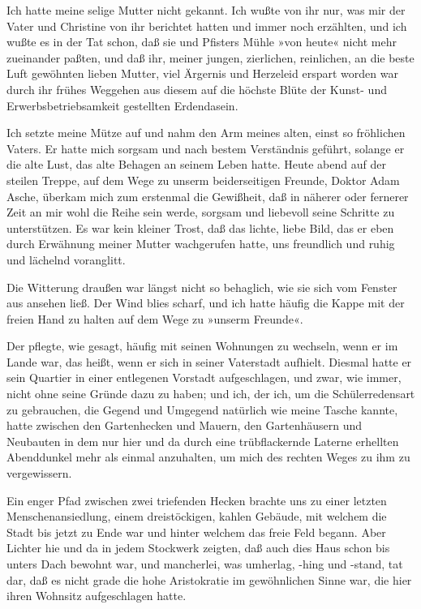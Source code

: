 Ich hatte meine selige Mutter nicht gekannt. Ich wußte von ihr nur,
was mir der Vater und Christine von ihr berichtet hatten und immer
noch erzählten, und ich wußte es in der Tat schon, daß sie und
Pfisters Mühle »von heute« nicht mehr zueinander paßten, und daß
ihr, meiner jungen, zierlichen, reinlichen, an die beste Luft
gewöhnten lieben Mutter, viel Ärgernis und Herzeleid erspart worden
war durch ihr frühes Weggehen aus diesem auf die höchste Blüte der
Kunst- und Erwerbsbetriebsamkeit gestellten Erdendasein.

Ich setzte meine Mütze auf und nahm den Arm meines alten, einst so
fröhlichen Vaters. Er hatte mich sorgsam und nach bestem
Verständnis geführt, solange er die alte Lust, das alte Behagen an
seinem Leben hatte. Heute abend auf der steilen Treppe, auf dem
Wege zu unserm beiderseitigen Freunde, Doktor Adam Asche, überkam
mich zum erstenmal die Gewißheit, daß in näherer oder fernerer Zeit
an mir wohl die Reihe sein werde, sorgsam und liebevoll seine
Schritte zu unterstützen. Es war kein kleiner Trost, daß das
lichte, liebe Bild, das er eben durch Erwähnung meiner Mutter
wachgerufen hatte, uns freundlich und ruhig und lächelnd
voranglitt.

Die Witterung draußen war längst nicht so behaglich, wie sie sich
vom Fenster aus ansehen ließ. Der Wind blies scharf, und ich hatte
häufig die Kappe mit der freien Hand zu halten auf dem Wege zu
»unserm Freunde«.

Der pflegte, wie gesagt, häufig mit seinen Wohnungen zu wechseln,
wenn er im Lande war, das heißt, wenn er sich in seiner Vaterstadt
aufhielt. Diesmal hatte er sein Quartier in einer entlegenen
Vorstadt aufgeschlagen, und zwar, wie immer, nicht ohne seine
Gründe dazu zu haben; und ich, der ich, um die Schülerredensart zu
gebrauchen, die Gegend und Umgegend natürlich wie meine Tasche
kannte, hatte zwischen den Gartenhecken und Mauern, den
Gartenhäusern und Neubauten in dem nur hier und da durch eine
trübflackernde Laterne erhellten Abenddunkel mehr als einmal
anzuhalten, um mich des rechten Weges zu ihm zu vergewissern.

Ein enger Pfad zwischen zwei triefenden Hecken brachte uns zu einer
letzten Menschenansiedlung, einem dreistöckigen, kahlen Gebäude,
mit welchem die Stadt bis jetzt zu Ende war und hinter welchem das
freie Feld begann. Aber Lichter hie und da in jedem Stockwerk
zeigten, daß auch dies Haus schon bis unters Dach bewohnt war, und
mancherlei, was umherlag, -hing und -stand, tat dar, daß es nicht
grade die hohe Aristokratie im gewöhnlichen Sinne war, die hier
ihren Wohnsitz aufgeschlagen hatte.

